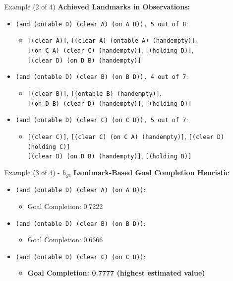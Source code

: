 \documentclass{beamer}
\begin{document}
    \begin{frame}{Example (2 of 4)}
		\textbf{Achieved Landmarks in Observations:}
       	\begin{itemize}
       		\item \texttt{(and (ontable D) (clear A) (on A D)), 5 out of 8}:
				\begin{itemize}
					\item {\scriptsize \texttt{[(clear A)]}, \texttt{[(clear A) (ontable A) (handempty)]},
					\\ \texttt{[(on C A) (clear C) (handempty)]}, \texttt{[(holding D)]},
					\\ \texttt{[(clear D) (on D B) (handempty)]}}
				\end{itemize}
			\item \texttt{(and (ontable D) (clear B) (on B D)), 4 out of 7}:
				\begin{itemize}
					\item {\scriptsize \texttt{[(clear B)]}, \texttt{[(ontable B) (handempty)]},
					\\ \texttt{[(on D B) (clear D) (handempty)]}, \texttt{[(holding D)]}}
				\end{itemize}
			\item \texttt{(and (ontable D) (clear C) (on C D)), 5 out of 7}:
				\begin{itemize}
					\item {\scriptsize \texttt{[(clear C)]}, \texttt{[(clear C) (on C A) (handempty)]}, \texttt{[(clear D) (holding C)]}
					\\ \texttt{[(clear D) (on D B) (handempty)]}, \texttt{[(holding D)]}}
				\end{itemize}
		\end{itemize}
    \end{frame}

    \begin{frame}{Example (3 of 4) - $h_{gc}$}
		\textbf{Landmark-Based Goal Completion Heuristic}
       	\begin{itemize}
       		\item \texttt{(and (ontable D) (clear A) (on A D))}:%
				\begin{itemize}
					\item Goal Completion: 0.7222
				\end{itemize}
			\item \texttt{(and (ontable D) (clear B) (on B D))}:%
				\begin{itemize}
					\item Goal Completion: 0.6666
				\end{itemize}
			\item \texttt{(and (ontable D) (clear C) (on C D))}:%
				\begin{itemize}
					\item \textbf{Goal Completion: 0.7777 (highest estimated value)}
				\end{itemize}
		\end{itemize}
    \end{frame}
\end{document}
